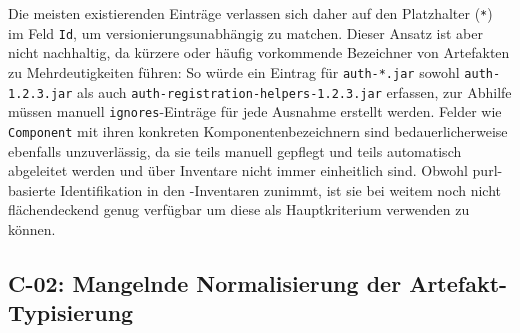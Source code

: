 Die meisten existierenden Einträge verlassen sich daher auf den Platzhalter (\texttt{*}) im Feld \texttt{Id}, um versionierungsunabhängig zu matchen.
Dieser Ansatz ist aber nicht nachhaltig, da kürzere oder häufig vorkommende Bezeichner von Artefakten zu Mehrdeutigkeiten führen:
So würde ein Eintrag für \texttt{auth-*.jar} sowohl \texttt{auth-1.2.3.jar} als auch \texttt{auth-registration-helpers-1.2.3.jar} erfassen, zur Abhilfe müssen manuell \texttt{ignores}-Einträge für jede Ausnahme erstellt werden.
Felder wie \texttt{Component} mit ihren konkreten Komponentenbezeichnern sind bedauerlicherweise ebenfalls unzuverlässig, da sie teils manuell gepflegt und teils automatisch abgeleitet werden und über Inventare nicht immer einheitlich sind.
Obwohl \acrshort{purl}-basierte Identifikation in den \metaeffekt-Inventaren zunimmt, ist sie bei weitem noch nicht flächendeckend genug verfügbar um diese als Hauptkriterium verwenden zu können.

\subsection{C-02: Mangelnde Normalisierung der Artefakt-Typisierung}\label{subsec:c-02-uneindeutige-artefakt-typinformation}

%

